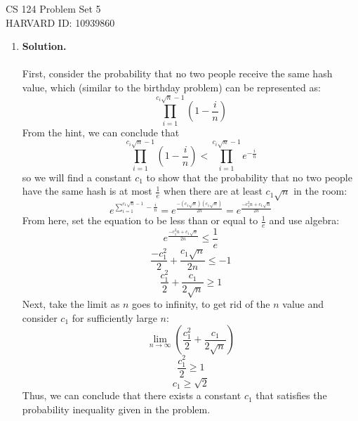 \documentclass[11pt]{article}
\newcommand\solution{%
  \textbf{Solution.}\\%
}
\begin{document}
CS 124 Problem Set 5 \\
\indent HARVARD ID: 10939860

\begin{enumerate}

\item

\solution \\
First, consider the probability that no two people receive the same hash value, which (similar to the birthday problem) can be represented as: 
\begin{equation*}
  \prod_{i=1}^{c_i \sqrt{n} - 1} (1-\frac{i}{n})
\end{equation*}
From the hint, we can conclude that 
\begin{equation*}
  \prod_{i=1}^{c_i \sqrt{n} - 1} (1-\frac{i}{n}) < \prod_{i=1}^{c_i \sqrt{n} - 1} e^{-\frac{i}{n}}
\end{equation*}
so we will find a constant $c_1$ to show that the probability that no two people have the same hash is at most $\frac{1}{e}$ when there are at least $c_1 \sqrt{n}$ in the room:
\begin{equation*}
  e^{\sum_{i=1}^{c_1 \sqrt{n} - 1} -\frac{i}{n}} = e^{\frac{-(c_1 \sqrt{n})(c_1 \sqrt{n})}{2n}} = e^{\frac{-c_1^2 n + c_1 \sqrt{n}}{2n}}
\end{equation*}
From here, set the equation to be less than or equal to $\frac{1}{e}$ and use algebra:
\begin{equation*}
  e^{\frac{-c_1^2 n + c_1 \sqrt{n}}{2n}} \leq \frac{1}{e}
\end{equation*}
\begin{equation*}
  \frac{-c_1^2}{2} + \frac{c_1 \sqrt{n}}{2n} \leq -1
\end{equation*}
\begin{equation*}
  \frac{c_1^2}{2} + \frac{c_1}{2\sqrt{n}} \geq 1
\end{equation*}
Next, take the limit as $n$ goes to infinity, to get rid of the $n$ value and consider $c_1$ for sufficiently large $n$:
\begin{equation*}
  \displaystyle \lim_{n \to \infty} (\frac{c_1^2}{2} + \frac{c_1}{2\sqrt{n}})
\end{equation*}
\begin{equation*}
  \frac{c_1^2}{2} \geq 1
\end{equation*}
\begin{equation*}
  c_1 \geq \sqrt{2}
\end{equation*}
Thus, we can conclude that there exists a constant $c_1$ that satisfies the probability inequality given in the problem. \\

\end{enumerate}
\end{document}
